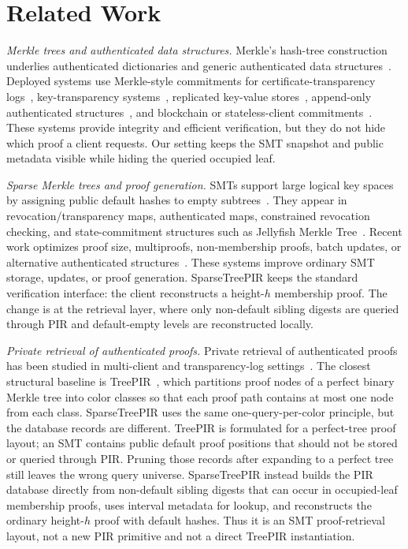 \section{Related Work}
\label{sec:related}

\textit{Merkle trees and authenticated data structures.}
Merkle's hash-tree construction~\cite{merkle} underlies authenticated dictionaries and generic authenticated data structures~\cite{padauth,adsgeneric}. Deployed systems use Merkle-style commitments for certificate-transparency logs~\cite{ctv2,ctqueue,crosbywallach}, key-transparency systems~\cite{coniks,transdict,parakeet,optiks}, replicated key-value stores~\cite{dynamo}, append-only authenticated structures~\cite{balloon}, and blockchain or stateless-client commitments~\cite{utreexo,ethereum,zcash}. These systems provide integrity and efficient verification, but they do not hide which proof a client requests. Our setting keeps the SMT snapshot and public metadata visible while hiding the queried occupied leaf.

\textit{Sparse Merkle trees and proof generation.}
SMTs support large logical key spaces by assigning public default hashes to empty subtrees~\cite{sparsemt}. They appear in revocation/transparency maps, authenticated maps, constrained revocation checking, and state-commitment structures such as Jellyfish Merkle Tree~\cite{revtrans,vcer,jmt}. Recent work optimizes proof size, multiproofs, non-membership proofs, batch updates, or alternative authenticated structures~\cite{compactmultiproof,rollupsmt,multicollisiontree}. These systems improve ordinary SMT storage, updates, or proof generation. SparseTreePIR keeps the standard verification interface: the client reconstructs a height-$h$ membership proof. The change is at the retrieval layer, where only non-default sibling digests are queried through PIR and default-empty levels are reconstructed locally.

\textit{Private retrieval of authenticated proofs.}
Private retrieval of authenticated proofs has been studied in multi-client and transparency-log settings~\cite{lueksgoldberg,ctprivacy,kalesct}. The closest structural baseline is TreePIR~\cite{treepir}, which partitions proof nodes of a perfect binary Merkle tree into color classes so that each proof path contains at most one node from each class. SparseTreePIR uses the same one-query-per-color principle, but the database records are different. TreePIR is formulated for a perfect-tree proof layout; an SMT contains public default proof positions that should not be stored or queried through PIR. Pruning those records after expanding to a perfect tree still leaves the wrong query universe. SparseTreePIR instead builds the PIR database directly from non-default sibling digests that can occur in occupied-leaf membership proofs, uses interval metadata for lookup, and reconstructs the ordinary height-$h$ proof with default hashes. Thus it is an SMT proof-retrieval layout, not a new PIR primitive and not a direct TreePIR instantiation.


